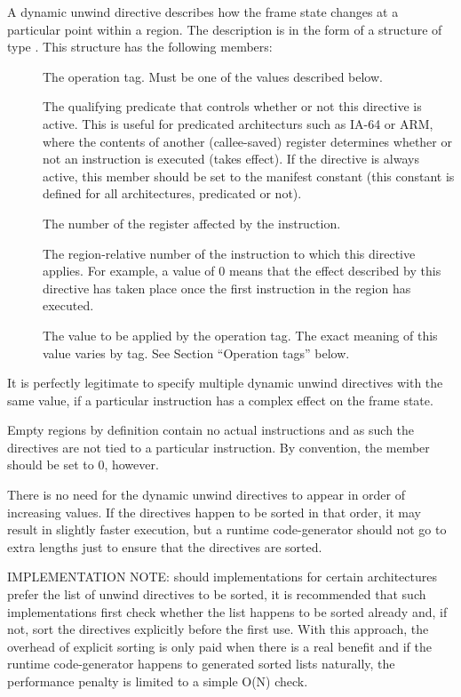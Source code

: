 \documentclass{article}
\begin{document}
A dynamic unwind directive describes how the frame state changes
at a particular point within a region.  The description is in
the form of a structure of type .  This
structure has the following members:
\begin{description}
\item[ ] The operation tag.  Must be one
  of the  values described below.
\item[ ] The qualifying predicate that controls
  whether or not this directive is active.  This is useful for
  predicated architecturs such as IA-64 or ARM, where the contents of
  another (callee-saved) register determines whether or not an
  instruction is executed (takes effect).  If the directive is always
  active, this member should be set to the manifest constant
   (this constant is defined for all
  architectures, predicated or not).
\item[ ] The number of the register affected
  by the instruction.
\item[ ] The region-relative number of
  the instruction to which this directive applies.  For example,
  a value of 0 means that the effect described by this directive
  has taken place once the first instruction in the region has
  executed.
\item[ ] The value to be applied by the
  operation tag.  The exact meaning of this value varies by tag.  See
  Section ``Operation tags'' below.
\end{description}
It is perfectly legitimate to specify multiple dynamic unwind
directives with the same  value, if a particular instruction
has a complex effect on the frame state.

Empty regions by definition contain no actual instructions and as such
the directives are not tied to a particular instruction.  By
convention, the  member should be set to 0, however.

There is no need for the dynamic unwind directives to appear
in order of increasing  values.  If the directives happen to
be sorted in that order, it may result in slightly faster execution,
but a runtime code-generator should not go to extra lengths just to
ensure that the directives are sorted.

IMPLEMENTATION NOTE: should  implementations for
certain architectures prefer the list of unwind directives to be
sorted, it is recommended that such implementations first check
whether the list happens to be sorted already and, if not, sort the
directives explicitly before the first use.  With this approach, the
overhead of explicit sorting is only paid when there is a real benefit
and if the runtime code-generator happens to generated sorted lists
naturally, the performance penalty is limited to a simple O(N) check.
\end{document}
